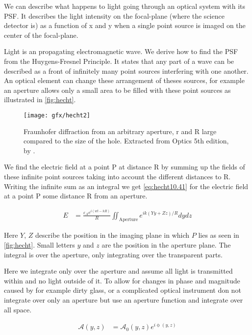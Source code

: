 We can describe what happens to light going through an optical system with its \ac{PSF}. It describes the light intensity on the focal-plane (where the science detector is) as a function of x and y when a single point source is imaged on the center of the focal-plane. 

Light is an propagating electromagnetic wave. We derive how to find the \ac{PSF} from the Huygens-Fresnel Principle. It states that any part of a wave can be described as a front of infinitely many point sources interfering with one another. An optical element can change these arrangement of theses sources, for example an aperture allows only a small area to be filled with these point sources as illustrated in \autoref{fig:hecht}. 

\begin{figure}[h]
    \caption{Fraunhofer diffraction from an arbitrary aperture, r and R large compared to the size of the hole. Extracted from Optics 5th edition, by \cite{hecht}.}
    \centering
    \texttt{[image: gfx/hecht2]}
    \label{fig:hecht}
\end{figure}

We find the electric field at a point P at distance R by summing up the fields of these infinite point sources taking into account the different distances to R. Writing the infinite sum as an integral we get \autoref{eq:hecht10.41} for the electric field at a point P some distance R from an aperture.

\begin{subequations}
    \begin{align}
        E &= \frac{\varepsilon_A e^{i(wt-kR)}}{R} \iint_{\text{Aperture}} e^{ik(Yy+Zz)/R} dydz%
        \label{eq:hecht10.41}
    \end{align}
\end{subequations}

Here $Y$, $Z$ describe the position in the imaging plane in which $P$ lies as seen in \autoref{fig:hecht}. Small letters $y$ and $z$ are the position in the aperture plane. The integral is over the aperture, only integrating over the transparent parts. 

Here we integrate only over the aperture and assume all light is transmitted within and no light outside of it. To allow for changes in phase and magnitude caused by for example dirty glass, or a complicated optical instrument don not integrate over only an aperture but use an aperture function and integrate over all space.

\begin{align}
\mathscr{A}(y,z) &= \mathscr{A}_0 (y,z)e^{i\upphi(y,z)}\label{eq:helper}
\end{align}

